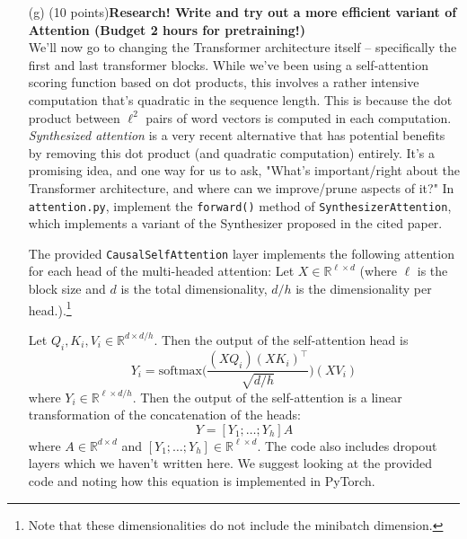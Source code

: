 \documentclass[letterpaper,12pt]{article}
\begin{document}
\begin{itemize}
	\item[(g)]
		(10 points)\textbf{Research! Write and try out a more efficient variant of Attention (Budget 2 hours for pretraining!)}\\
		
		We'll now go to changing the Transformer architecture itself -- specifically the first and last transformer blocks.
		While we've been using a self-attention scoring function based on dot products, this involves a rather intensive computation that's quadratic in the sequence length. This is because the dot product between $\ell^2$ pairs of word vectors is computed in each computation. \textit{Synthesized attention} \cite{b3} is a very recent alternative that has potential benefits by removing this dot product (and quadratic computation) entirely. It's a promising idea, and one way for us to ask, "What's important/right about the Transformer architecture, and where can we improve/prune aspects of it?" In \texttt{attention.py}, implement the \texttt{forward()} method of \texttt{SynthesizerAttention}, which implements a variant of the Synthesizer proposed in the cited paper.
		
		The provided \texttt{CausalSelfAttention} layer implements the following attention for each head of the multi-headed attention: Let $X\in \mathbb{R}^{\ell \times d}$ (where $\ell$ is the block size and $d$ is the total dimensionality, $d/h$ is the dimensionality per head.).\footnote{Note that these dimensionalities do not include the minibatch dimension.}
		
		Let $Q_i,K_i,V_i \in \mathbb{R}^{d\times d/h}$.
		Then the output of the self-attention head is 
		\begin{equation} \label{qkv_eqn}
			Y_i = \text{softmax}\bigg(\frac{(XQ_i)(XK_i)^\top}{\sqrt{d/h}}\bigg)(XV_i)
		\end{equation}
		where $Y_i\in\mathbb{R}^{\ell \times d/h}$.
		Then the output of the self-attention is a linear transformation of the concatenation of the heads:
		\begin{equation}
			Y = [Y_1;\dots;Y_h]A
		\end{equation}
		where $A \in\mathbb{R}^{d\times d}$ and $[Y_1;\dots;Y_h]\in\mathbb{R}^{\ell \times d}$.
		The code also includes dropout layers which we haven't written here.
		We suggest looking at the provided code and noting how this equation is implemented in PyTorch.


\end{itemize}
\end{document}
